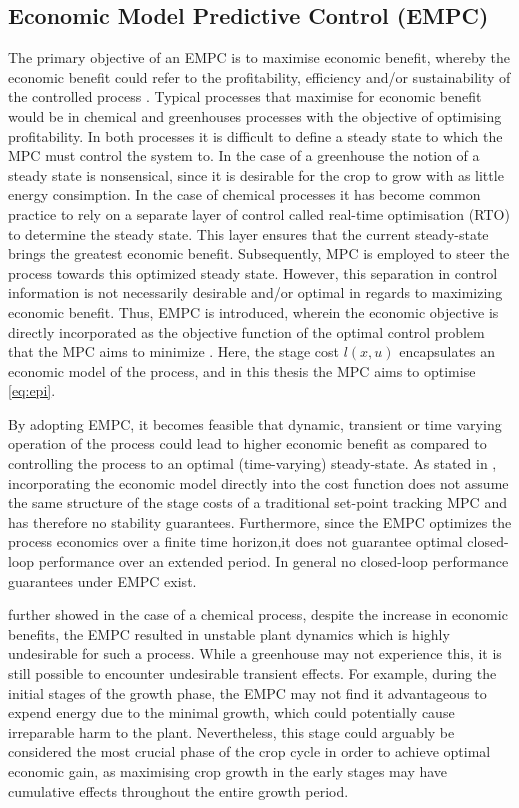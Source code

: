 \subsection{Economic Model Predictive Control (EMPC)}
The primary objective of an EMPC is to maximise economic benefit, whereby the economic benefit could refer to the profitability, efficiency and/or sustainability of the controlled process \cite{ellisTutorialReviewEconomic2014}. Typical processes that maximise for economic benefit would be in chemical and greenhouses processes with the objective of optimising profitability. In both processes it is difficult to define a steady state to which the MPC must control the system to. In the case of a greenhouse the notion of a steady state is nonsensical, since it is desirable for the crop to grow with as little energy consimption. In the case of chemical processes it has become common practice to rely on a separate layer of control called real-time optimisation (RTO) to determine the steady state. This layer ensures that the current steady-state brings the greatest economic benefit. Subsequently, MPC is employed to steer the process towards this optimized steady state. However, this separation in control information is not necessarily desirable and/or optimal in regards to maximizing economic benefit. Thus, EMPC is introduced, wherein the economic objective is directly incorporated as the objective function of the optimal control problem that the MPC aims to minimize \cite{rawlingsFundamentalsEconomicModel2012}. Here, the stage cost $l(x,u)$ encapsulates an economic model of the process, and in this thesis the MPC aims to optimise \autoref{eq:epi}.

By adopting EMPC, it becomes feasible that dynamic, transient or time varying operation of the process could lead to higher economic benefit as compared to controlling the process to an optimal (time-varying) steady-state. As stated in \cite{rawlingsFundamentalsEconomicModel2012}, incorporating the economic model directly into the cost function does not assume the same structure of the stage costs of a traditional set-point tracking MPC and has therefore no stability guarantees. Furthermore, since the EMPC optimizes the process economics  over a finite time horizon,it does not guarantee optimal closed-loop performance over an extended period. In general no closed-loop performance guarantees under EMPC exist\cite{ellisTutorialReviewEconomic2014}.

\cite{rawlingsFundamentalsEconomicModel2012} further showed  in the case of a chemical process, despite the increase in economic benefits, the EMPC  resulted in unstable plant dynamics which is highly undesirable for such a process. While a greenhouse may not experience this, it is still possible to encounter undesirable transient effects. For example, during the initial stages of the growth phase, the EMPC may not find it advantageous to expend energy due to the minimal growth, which could potentially cause irreparable harm to the plant. Nevertheless, this stage could arguably be considered the most crucial phase of the crop cycle in order to achieve optimal economic gain, as maximising crop growth in the early stages may have cumulative effects throughout the entire growth period.

